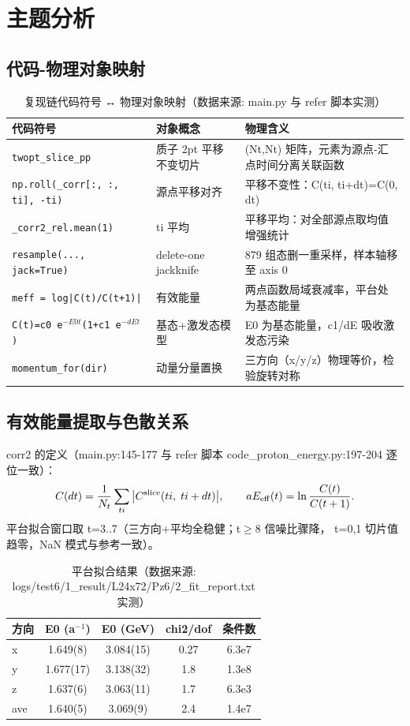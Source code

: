 \documentclass[UTF8]{ctexart}
\begin{document}
\section{主题分析}
\subsection{代码-物理对象映射}
\begin{table}[htbp]\centering
\begin{tabularx}{\textwidth}{lX X}
\toprule
\textcolor{struct}{代码符号} & \textcolor{struct}{对象概念} & \textcolor{struct}{物理含义} \\
\midrule
\texttt{twopt\_slice\_pp} & 质子 2pt 平移不变切片 & (Nt,Nt) 矩阵，元素为源点-汇点时间分离关联函数 \\
\texttt{np.roll(\_corr[:, :, ti], -ti)} & 源点平移对齐 & 平移不变性：C(ti, ti+dt)=C(0, dt) \\
\texttt{\_corr2\_rel.mean(1)} & ti 平均 & 平移平均：对全部源点取均值增强统计 \\
\texttt{resample(..., jack=True)} & delete-one jackknife & 879 组态删一重采样，样本轴移至 axis 0 \\
\texttt{meff = log|C(t)/C(t+1)|} & 有效能量 & 两点函数局域衰减率，平台处为基态能量 \\
\texttt{C(t)=c0 e$^{-E0 t}$(1+c1 e$^{-dE t}$)} & 基态+激发态模型 & E0 为基态能量，c1/dE 吸收激发态污染 \\
\texttt{momentum\_for(dir)} & 动量分量置换 & 三方向（x/y/z）物理等价，检验旋转对称 \\
\bottomrule
\end{tabularx}
\caption{复现链代码符号 ↔ 物理对象映射（数据来源: main.py 与 refer 脚本实测）}
\end{table}

\subsection{有效能量提取与色散关系}
corr2 的定义（main.py:145-177 与 refer 脚本 code\_proton\_energy.py:197-204 逐位一致）：
\begin{equation}\label{eq:corr2}
C(dt)=\frac{1}{N_t}\sum_{ti}\big|C^{\rm slice}(ti,\;ti+dt)\big|,\qquad
aE_{\rm eff}(t)=\ln\frac{C(t)}{C(t+1)} .
\end{equation}
平台拟合窗口取 t=3..7（三方向+平均全稳健；t$\ge$8 信噪比骤降，
t=0,1 切片值趋零，NaN 模式与参考一致）。

\begin{table}[htbp]\centering
\begin{tabular}{lcccc}
\toprule
方向 & E0 (a$^{-1}$) & E0 (GeV) & chi2/dof & 条件数 \\
\midrule
x  & 1.649(8)  & 3.084(15) & 0.27 & 6.3e7 \\
y  & 1.677(17) & 3.138(32) & 1.8  & 1.3e8 \\
z  & 1.637(6)  & 3.063(11) & 1.7  & 6.3e3 \\
ave & 1.640(5) & 3.069(9)  & 2.4  & 1.4e7 \\
\bottomrule
\end{tabular}
\caption{平台拟合结果（数据来源: logs/test6/1\_result/L24x72/Pz6/2\_fit\_report.txt 实测）}
\end{table}
\end{document}
